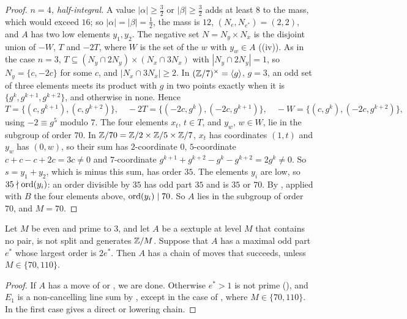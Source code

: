 \begin{proof}
\emph{$n=4$, half-integral.} A value $|\alpha|\ge\frac32$ or
$|\beta|\ge\frac32$ adds at least $8$ to the mass, which would exceed $16$; so
$|\alpha|=|\beta|=\frac12$, the mass is $12$, $(N_{e},N_{e^{*}})=(2,2)$, and
$A$ has two low elements $y_{1},y_{2}$. The negative set $N=N_{y}\times N_{x}$
is the disjoint union of $-W$, $T$ and $-2T$, where $W$ is the set of the $w$
with $y_{w}\in A$ ((iv)). As in the case $n=3$,
$T\subseteq(N_{y}\cap2N_{y})\times(N_{x}\cap3N_{x})$ with
$|N_{y}\cap2N_{y}|=1$, so $N_{y}=\{c,-2c\}$ for some $c$, and $|N_{x}\cap
3N_{x}|\ge2$. In $(\mathbb{Z}/7)^{\times}=\langle g\rangle$, $g=3$, an odd set of
three elements meets its product with $g$ in two points exactly when it is
$\{g^{k},g^{k+1},g^{k+2}\}$, and otherwise in none. Hence
\[
  T=\{(c,g^{k+1}),(c,g^{k+2})\},\quad -2T=\{(-2c,g^{k}),(-2c,g^{k+1})\},
  \quad -W=\{(c,g^{k}),(-2c,g^{k+2})\},
\]
using $-2\equiv g^{5}$ modulo $7$. The four elements $x_{t}$, $t\in T$, and
$y_{w}$, $w\in W$, lie in the subgroup of order $70$. In
$\mathbb{Z}/70=\mathbb{Z}/2\times\mathbb{Z}/5\times\mathbb{Z}/7$, $x_{t}$ has coordinates $(1,t)$ and
$y_{w}$ has $(0,w)$, so their sum has $2$-coordinate $0$, $5$-coordinate
$c+c-c+2c=3c\ne0$ and $7$-coordinate $g^{k+1}+g^{k+2}-g^{k}-g^{k+2}=2g^{k}
\ne0$. So $s=y_{1}+y_{2}$, which is minus this sum, has order $35$. The
elements $y_{i}$ are low, so $35\nmid\operatorname{ord}(y_{i})$: an order divisible by $35$
has odd part $35$ and is $35$ or $70$. By , applied with $B$
the four elements above, $\operatorname{ord}(y_{i})\mid70$. So $A$ lies in the subgroup of
order $70$, and $M=70$.
\end{proof}

\begin{theorem}\label{thm:twoparallel}
Let $M$ be even and prime to $3$, and let $A$ be a sextuple at level $M$ that
contains no pair, is not split and generates $\mathbb{Z}/M$. Suppose that $A$ has a
maximal odd part $e^{*}$ whose largest order is $2e^{*}$. Then $A$ has a chain
of moves that succeeds, unless $M\in\{70,110\}$.
\end{theorem}

\begin{proof}
If $A$ has a move of  or , we are
done. Otherwise $e^{*}>1$ is not prime (), and $E_{1}$ is a
non-cancelling line sum by
, except in the case
of , where $M\in\{70,110\}$. In the first case
 gives a direct or lowering chain.
\end{proof}
